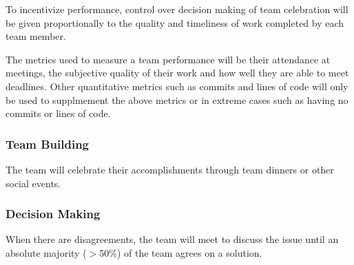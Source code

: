 \documentclass{article}
\begin{document}
\noindent To incentivize performance, control over decision making of team celebration will be given proportionally to the quality and timeliness of work completed by each team member.

\noindent The metrics used to measure a team performance will be their attendance at meetings, the subjective quality of their work and how well they are able to meet deadlines.
Other quantitative metrics such as commits and lines of code will only be used to supplmement the above metrics or in extreme cases such as having no commits or lines of code.
\subsubsection*{Team Building}


\noindent The team will celebrate their accomplishments through team dinners or other social events.

\subsubsection*{Decision Making} 


\noindent When there are disagreements, the team will meet to discuss the issue until an absolute majority ($>$50\%) of the team agrees on a solution.
\end{document}

